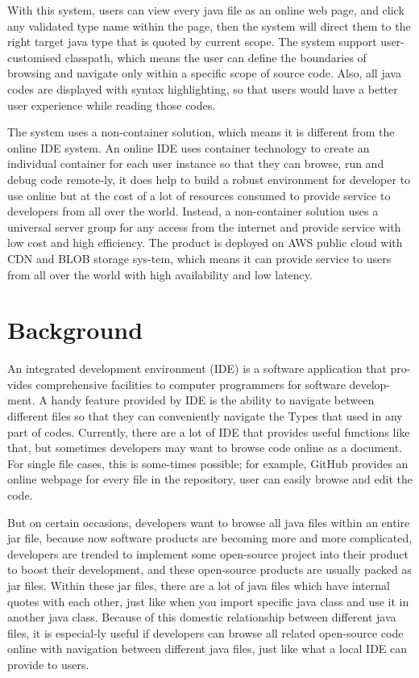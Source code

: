 \documentclass[runningheads]{llncs}
\begin{document}
With this system, users can view every java file as an online web page, and click any validated type name within the page, then the system will direct them to the right target java type that is quoted by current scope.
The system support user-customised classpath, which means the user can define the boundaries of browsing and navigate only within a specific scope of source code. Also, all java codes are displayed with syntax highlighting, so that users would have a better user experience while reading those codes.

The system uses a non-container solution, which means it is different from the online IDE system. An online IDE uses container technology to create an individual container for each user instance so that they can browse, run and debug code remote-ly, it does help to build a robust environment for developer to use online but at the cost of a lot of resources consumed to provide service to developers from all over the world. Instead, a non-container solution uses a universal server group for any access from the internet and provide service with low cost and high efficiency.
The product is deployed on AWS public cloud with CDN\cite{Content_delivery_network} and BLOB\cite{Binary_large_object} storage sys-tem, which means it can provide service to users from all over the world with high availability and low latency.


\section{Background}

An integrated development environment (IDE) is a software application that pro-vides comprehensive facilities to computer programmers for software develop-ment\cite{Ide_introduction}. A handy feature provided by IDE is the ability to navigate between different files so that they can conveniently navigate the Types that used in any part of codes. Currently, there are a lot of IDE that provides useful functions like that, but sometimes developers may want to browse code online as a document. For single file cases, this is some-times possible; for example, GitHub\cite{GitHub} provides an online webpage for every file in the repository, user can easily browse and edit the code. 

But on certain occasions, developers want to browse all java files within an entire jar file, because now software products are becoming more and more complicated, developers are trended to implement some open-source project into their product to boost their development, and these open-source products are usually packed as jar files. Within these jar files, there are a lot of java files which have internal quotes with each other, just like when you import specific java class and use it in another java class. Because of this domestic relationship between different java files, it is especial-ly useful if developers can browse all related open-source code online with navigation between different java files, just like what a local IDE can provide to users.
\end{document}
